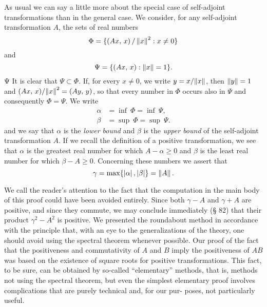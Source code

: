As usual we can say a little more about the special case of self-adjoint
transformations than in the general case. We consider, for any self-adjoint
transformation \(A\), the sets of real numbers
\begin{equation*}
    \Phi = \{\left(Ax,\,x\right) / \left\lVert x\right\rVert^2 : x \neq 0\}
\end{equation*}
and
\begin{equation*}
    \Psi = \{\left(Ax,\,x\right) : \left\lVert x\right\rVert = 1\}.
\end{equation*}
Ψ  It is clear that \(\Psi \subset \Phi\). If, for every \(x \neq 0\), we write
\(y = {x}/{\left\lVert x\right\rVert}\), then \(\left\lVert y\right\rVert = 1\) and
\({\left(Ax,\,x\right)}/{\left\lVert x\right\rVert^2} = \left(Ay,\,y\right)\), so that every number
in \(\Phi\) occurs also in \(\Psi\) and consequently \(\Phi = \Psi\). We write
\begin{align*}
    \alpha & = \inf~\Phi = \inf~\Psi,\\
    \beta & = \sup~\Phi = \sup~\Psi.
\end{align*}
and we say that \(\alpha\) is the \emph{lower bound} and \(\beta\) is the
\emph{upper bound} of the self-adjoint transformation \(A\). If we recall the
definition of a positive transformation, we see that \(\alpha\) is the greatest
real number for which \(A - \alpha \geq 0\) and \(\beta\) is the least real
number for which \(\beta - A \geq 0\). Concerning these numbers we assert that
\begin{equation*}
    \gamma = \max \{\left\lvert\alpha\right\rvert, \left\lvert\beta\right\rvert\} = \left\lVert A\right\rVert.
\end{equation*}


We call the reader's attention to the fact that the computation in the main body
of this proof could have been avoided entirely. Since both \(\gamma - A\) and
\(\gamma + A\) are positive, and since they commute, we may conclude immediately
(§ 82) that their product \(\gamma^2 - A^2\) is positive. We presented the
roundabout method in accordance with the principle that, with an eye to the
generalizations of the theory, one should avoid using the spectral theorem
whenever possible. Our proof of the fact that the positiveness and commutativity
of \(A\) and \(B\) imply the positiveness of \(AB\) was based on the existence
of square roots for positive transformations. This fact, to be sure, can be
obtained by so-called ``elementary'' methods, that is, methods not using the
spectral theorem, but even the simplest elementary proof involves complications
that are purely technical and, for our pur- poses, not particularly useful.

